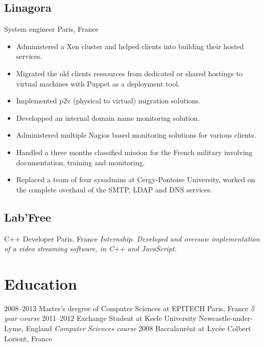 \documentclass[]{friggeri-cv} %
\begin{document}
\subsection{Linagora}
\begin{entrylist}
 {System engineer} {Paris, France} {
  \begin{itemize}
    \item Administered a Xen cluster and helped clients into building their hosted services.
    \item Migrated the old clients ressources from dedicated or shared hostings to virtual machines with Puppet as a deployment tool.
    \item Implemented p2v (physical to virtual) migration solutions.
    \item Developped an internal domain name monitoring solution.
    \item Administered multiple Nagios based monitoring solutions for various clients.
    \item Handled a three months classified mission for the French military involving documentation, training and monitoring.
    \item Replaced a team of four sysadmins at Cergy-Pontoise University, worked on the complete overhaul of the SMTP, LDAP and DNS services.
  \end{itemize}
}
\end{entrylist}


\subsection{Lab'Free}
\begin{entrylist}
 {C++ Developer} {Paris, France} {
  \emph{Internship. Developed and oversaw implementation of a video streaming software, in C++ and JavaScript.}
}
\end{entrylist}


\section{Education}

\begin{entrylist}
\entry
{2008--2013}
{Master's dregree {\normalfont of Computer Sciences at EPITECH}}
{Paris, France}
{\emph{5 year course}}
\entry
{2011--2012}
{Exchange Student {\normalfont at Keele University}}
{Newcastle-under-Lyme, England}
{\emph{Computer Sciences course}}
\entry
{2008}
{Baccalauréat {\normalfont at Lycée Colbert}}
{Lorient, France}
{}
\end{entrylist}
\end{document}
